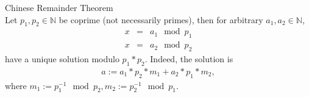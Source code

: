 \documentclass[10pt]{article}
\begin{document}
Chinese Remainder Theorem\\
Let $p_1,p_2 \in \mathbb{N}$ be coprime (not necessarily primes), then for arbitrary $a_1,a_2 \in \mathbb{N}$,
\begin{eqnarray} \nonumber
x &=& a_1 \mod p_1 \\
\nonumber
x &=& a_2 \mod p_2
\end{eqnarray}
have a unique solution modulo $p_1*p_2$.
Indeed, the solution is
\begin{eqnarray} \nonumber
a := a_1*p_2*m_1 + a_2*p_1*m_2,
\end{eqnarray}
where $m_1 := p_1^{-1} \mod p_2, m_2 := p_2^{-1} \mod p_1$.
\end{document}

